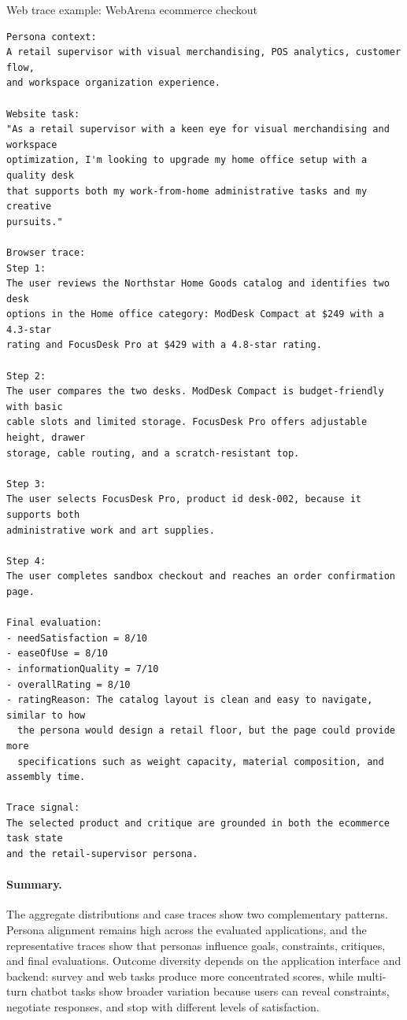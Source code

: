 \begin{promptbox}[label={box:trace-web}]{Web trace example: WebArena ecommerce checkout}
\begin{lstlisting}
Persona context:
A retail supervisor with visual merchandising, POS analytics, customer flow,
and workspace organization experience.

Website task:
"As a retail supervisor with a keen eye for visual merchandising and workspace
optimization, I'm looking to upgrade my home office setup with a quality desk
that supports both my work-from-home administrative tasks and my creative
pursuits."

Browser trace:
Step 1:
The user reviews the Northstar Home Goods catalog and identifies two desk
options in the Home office category: ModDesk Compact at $249 with a 4.3-star
rating and FocusDesk Pro at $429 with a 4.8-star rating.

Step 2:
The user compares the two desks. ModDesk Compact is budget-friendly with basic
cable slots and limited storage. FocusDesk Pro offers adjustable height, drawer
storage, cable routing, and a scratch-resistant top.

Step 3:
The user selects FocusDesk Pro, product id desk-002, because it supports both
administrative work and art supplies.

Step 4:
The user completes sandbox checkout and reaches an order confirmation page.

Final evaluation:
- needSatisfaction = 8/10
- easeOfUse = 8/10
- informationQuality = 7/10
- overallRating = 8/10
- ratingReason: The catalog layout is clean and easy to navigate, similar to how
  the persona would design a retail floor, but the page could provide more
  specifications such as weight capacity, material composition, and assembly time.

Trace signal:
The selected product and critique are grounded in both the ecommerce task state
and the retail-supervisor persona.
\end{lstlisting}
\end{promptbox}

\paragraph{Summary.}
The aggregate distributions and case traces show two complementary patterns. Persona alignment remains high across the evaluated applications, and the representative traces show that personas influence goals, constraints, critiques, and final evaluations. Outcome diversity depends on the application interface and backend: survey and web tasks produce more concentrated scores, while multi-turn chatbot tasks show broader variation because users can reveal constraints, negotiate responses, and stop with different levels of satisfaction.




